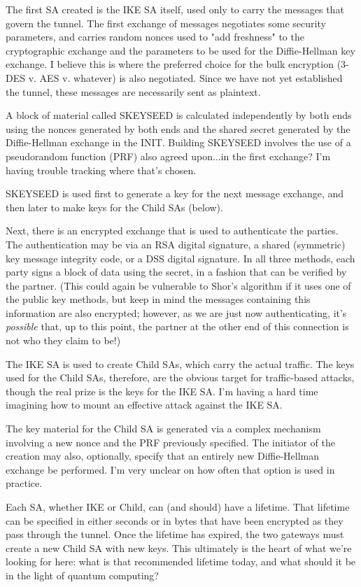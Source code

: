 \documentclass[%
 aip,
 jmp,%
 amsmath,amssymb,
 reprint,%
]{revtex4-1}
\begin{document}
The first SA created is the IKE SA itself, used only to carry the
messages that govern the tunnel.  The first exchange of messages
negotiates some security parameters, and carries random nonces used to
"add freshness" to the cryptographic exchange and the parameters to be
used for the Diffie-Hellman key exchange.  I believe this is where the
preferred choice for the bulk encryption (3-DES v. AES v. whatever) is
also negotiated.  Since we have not yet established the tunnel, these
messages are necessarily sent as plaintext.

A block of material called SKEYSEED is calculated independently by
both ends using the nonces generated by both ends and the
shared secret generated by the Diffie-Hellman exchange in the INIT.
Building SKEYSEED involves the use of a pseudorandom function (PRF)
also agreed upon...in the first exchange?  I'm having trouble tracking
where that's chosen.

SKEYSEED is used first to generate a key for the next message
exchange, and then later to make keys for the Child SAs (below).

Next, there is an encrypted exchange that is used to authenticate the
parties.  The authentication may be via an RSA digital signature, a
shared (symmetric) key message integrity code, or a DSS digital
signature.  In all three methods, each party signs a block of data
using the secret, in a fashion that can be verified by the partner.
(This could again be vulnerable to Shor's algorithm if it uses one of
the public key methods, but keep in mind the messages containing this
information are also encrypted; however, as we are just now
authenticating, it's \emph{possible} that, up to this point, the partner at
the other end of this connection is not who they claim to be!)

The IKE SA is used to create Child SAs, which carry the actual
traffic.  The keys used for the Child SAs, therefore, are the obvious
target for traffic-based attacks, though the real prize is the keys
for the IKE SA.  I'm having a hard time imagining how to mount an
effective attack against the IKE SA.

The key material for the Child SA is generated via a complex mechanism
involving a new nonce and the PRF previously specified.  The initiator
of the creation may also, optionally, specify that an entirely new
Diffie-Hellman exchange be performed.  I'm very unclear on how often
that option is used in practice.

Each SA, whether IKE or Child, can (and should) have a lifetime.  That
lifetime can be specified in either seconds or in bytes that have been
encrypted as they pass through the tunnel.  Once the lifetime has
expired, the two gateways must create a new Child SA with new keys.
This ultimately is the heart of what we're looking for here: what is
that recommended lifetime today, and what should it be in the light of
quantum computing?
\end{document}
